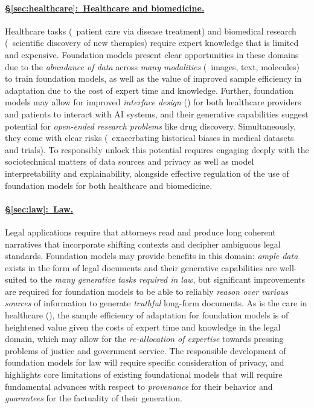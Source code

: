 \paragraph{\hyperref[sec:healthcare]{§\ref{sec:healthcare}:~Healthcare and biomedicine.}}

Healthcare tasks (\eg~patient care via disease treatment) and biomedical research (\eg~scientific discovery of new therapies) require expert knowledge that is limited and expensive. 
Foundation models present clear opportunities in these domains due to the \textit{abundance of data} across \textit{many modalities} (\eg~images, text, molecules) to train foundation models, as well as the value of improved sample efficiency in adaptation due to the cost of expert time and knowledge. 
Further, foundation models may allow for improved \textit{interface design} () for both healthcare providers and patients to interact with AI systems, and their generative capabilities suggest potential for \textit{open-ended research problems} like drug discovery. 
Simultaneously, they come with clear risks (\eg~exacerbating historical biases in medical datasets and trials). 
To responsibly unlock this potential requires engaging deeply with the sociotechnical matters of data sources and privacy as well as model interpretability and explainability, alongside effective regulation of the use of foundation models for both healthcare and biomedicine.

\paragraph{\hyperref[sec:law]{§\ref{sec:law}:~Law.}}

Legal applications require that attorneys read and produce long coherent
narratives that incorporate shifting contexts and decipher ambiguous legal standards.
Foundation models may provide benefits in this domain: \textit{ample data} exists in the form of legal documents and their generative capabilities are well-suited to the \textit{many generative tasks required in law}, but significant improvements are required for foundation models to be able to reliably \textit{reason over various sources} of information to generate \textit{truthful} long-form documents.
As is the care in healthcare (), the sample efficiency of adaptation for foundation models is of heightened value given the costs of expert time and knowledge in the legal domain, which may allow for the \textit{re-allocation of expertise} towards pressing problems of justice and government service.
The responsible development of foundation models for law will require specific consideration of privacy, and highlights core limitations of existing foundational models that will require fundamental advances with respect to \textit{provenance} for their behavior and \textit{guarantees} for the factuality of their generation.

